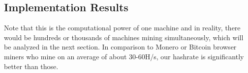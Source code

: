\documentclass[10pt, conference, compsocconf]{IEEEtran}
\begin{document}
\subsection{Implementation Results}


Note that this is the computational power of one machine and in reality, there would be hundreds or thousands of machines mining simultaneously, which will be analyzed in the next section. In comparison to Monero or Bitcoin browser miners who mine on an average of about 30-60H/s, our hashrate is significantly better than those.
\end{document}

